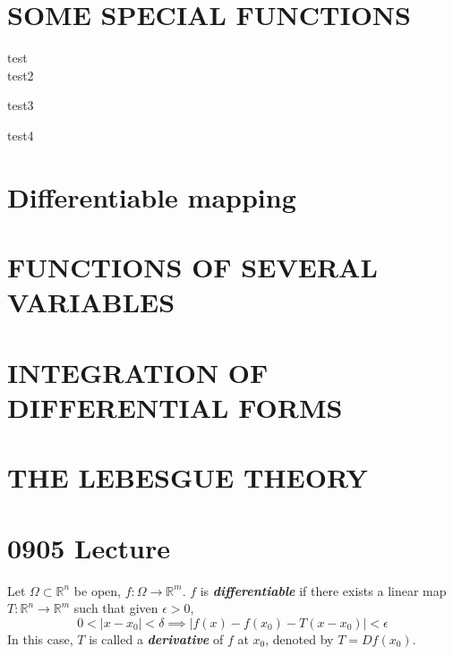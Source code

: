 \documentclass{article}
\begin{document}
\begin{multicols}{2}
\clearpage

\section{SOME SPECIAL FUNCTIONS}
\begin{notebox}
\begin{definition}[123]
test\\
test2
\end{definition}
\end{notebox}

\begin{definition}
test3
\end{definition}
\begin{definition}[Test]
test4
\end{definition}
\clearpage

\section{Differentiable mapping}

\clearpage

\section{FUNCTIONS OF SEVERAL VARIABLES}
\clearpage

\section{INTEGRATION OF DIFFERENTIAL FORMS}
\clearpage

\section{THE LEBESGUE THEORY}
\clearpage

\section{0905 Lecture}
\begin{mydefinition}
Let $\Omega\subset \mathbb{R}^n$ be open, $f:\Omega\to \mathbb{R}^m$. $f$ is \textbf{\emph{differentiable}} if there exists a linear map $T:\mathbb{R}^n\to \mathbb{R}^m$ such that given $\epsilon>0$,
$$0<|x-x_0|<\delta \implies |f(x)-f(x_0)-T(x-x_0)|<\epsilon$$
In this case, $T$ is called a \textbf{\emph{derivative}} of $f$ at $x_0$, denoted by $T=Df(x_0)$.
\end{mydefinition}

\begin{mydefinition}

\end{mydefinition}

\end{multicols}
\end{document}

